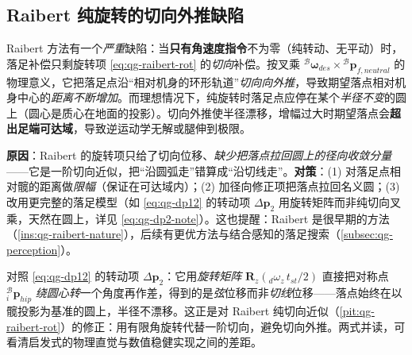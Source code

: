 \subsection{Raibert 纯旋转的切向外推缺陷}
\label{subsec:qg-raibert-flaw}

\begin{pitfall}\label{pit:qg-raibert-rot}
Raibert 方法有一个\emph{严重}缺陷：当\textbf{只有角速度指令}不为零（纯转动、无平动）时，落足补偿只剩旋转项 \cref{eq:qg-raibert-rot} 的\emph{切向}补偿。按叉乘 ${}^{\mathcal{B}}\boldsymbol{\omega}_{des}\times{}^{\mathcal{B}}\mathbf{p}_{f,neutral}$ 的物理意义，它把落足点沿“相对机身的环形轨道”\emph{切向向外推}，导致期望落点相对机身中心的\emph{距离不断增加}\cite{unitree2023quadruped}。而理想情况下，纯旋转时落足点应停在某个\emph{半径不变}的圆上（圆心是质心在地面的投影）。切向外推使半径漂移，增幅过大时期望落点会\textbf{超出足端可达域}，导致逆运动学无解或腿伸到极限。

\textbf{原因}：Raibert 的旋转项只给了切向位移、\emph{缺少把落点拉回圆上的径向收敛分量}——它是一阶切向近似，把“沿圆弧走”错算成“沿切线走”。\textbf{对策}：(1) 对落足点相对髋的距离做\emph{限幅}（保证在可达域内）；(2) 加径向修正项把落点拉回名义圆；(3) 改用更完整的落足模型（如 \cref{eq:qg-dp12} 的转动项 $\Delta\boldsymbol{p}_2$ 用旋转矩阵而非纯切向叉乘，天然在圆上，详见 \cref{eq:qg-dp2-note}）。这也提醒：Raibert 是很早期的方法（\cref{ins:qg-raibert-nature}），后续有更优方法与结合感知的落足搜索（\cref{subsec:qg-perception}）。
\end{pitfall}

\begin{note}[工程版旋转项为何无此缺陷]\label{eq:qg-dp2-note}
对照 \cref{eq:qg-dp12} 的转动项 $\Delta\boldsymbol{p}_2$：它用\emph{旋转矩阵} $\mathbf{R}_z({}_d\omega_z\,t_{st}/2)$ 直接把对称点 ${}_i^{\mathcal{B}}\boldsymbol{p}_{hip}$ \emph{绕圆心转}一个角度再作差，得到的是\emph{弦}位移而非\emph{切线}位移——落点始终在以髋投影为基准的圆上，半径不漂移。这正是对 Raibert 纯切向近似（\cref{pit:qg-raibert-rot}）的修正：用有限角旋转代替一阶切向，避免切向外推。两式并读，可看清启发式的物理直觉与数值稳健实现之间的差距。
\end{note}

